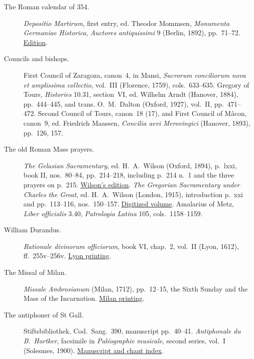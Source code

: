 \begin{description}
\item[The Roman calendar of 354.] \textit{Depositio Martirum},
  first entry, ed. Theodor Mommsen, \textit{Monumenta Germaniae
  Historica}, \textit{Auctores antiquissimi} 9 (Berlin, 1892),
  pp.~71--72.
  \href{https://www.dmgh.de/mgh_auct_ant_9/index.htm\#page/71/mode/1up}{Edition}.

\item[Councils and bishops.] First Council of Zaragoza, canon~4,
  in Mansi, \textit{Sacrorum conciliorum nova et amplissima collectio},
  vol.~III (Florence, 1759), cols.~633--635.
  Gregory of Tours, \textit{Histories} 10.31, section~VI,
  ed. Wilhelm Arndt (Hanover, 1884), pp.~444--445, and trans. O.~M.~Dalton (Oxford, 1927), vol.~II, pp.~471--472.
  Second Council of Tours, canon~18 (17), and First Council of Mâcon,
  canon~9, ed. Friedrich Maassen, \textit{Concilia aevi Merovingici}
  (Hanover, 1893), pp.~126, 157.

\item[The old Roman Mass prayers.] \textit{The Gelasian Sacramentary},
  ed. H.~A.~Wilson (Oxford, 1894), p.~lxxi, book II, nos.~80--84,
  pp.~214--218, including p.~214 n.~1 and
  the three prayers on p.~215.
  \href{https://archive.org/details/LiberSacramentorumRomanaeEcclesiae}{Wilson's edition}.
  \textit{The Gregorian
  Sacramentary under Charles the Great}, ed. H.~A.~Wilson
  (London, 1915), introduction p.~xxi and pp.~113--116, nos.~150--157.
  \href{https://commons.ptsem.edu/id/gregoriansacrame0049cath}{Digitized volume}.
  Amalarius of Metz, \textit{Liber officialis} 3.40,
  \textit{Patrologia Latina} 105, cols.~1158--1159.

\item[William Durandus.] \textit{Rationale divinorum officiorum},
  book VI, chap.~2, vol.~II (Lyon, 1612), ff.~255v--256v.
  \href{https://archive.org/details/rationalediuinor02dura}{Lyon printing}.

\item[The Missal of Milan.] \textit{Missale Ambrosianum} (Milan,
  1712), pp.~12--15, the Sixth Sunday and the Mass of the Incarnation.
  \href{https://archive.org/details/10869665bsb}{Milan printing}.

\item[The antiphoner of St Gall.] Stiftsbibliothek, Cod.~Sang.~390,
  manuscript pp.~40--41. \textit{Antiphonale du B.~Hartker}, facsimile
  in \textit{Paléographie musicale}, second series, vol.~I (Solesmes,
  1900). \href{https://cantusdatabase.org/chant/456197/}{Manuscript and chant index}.


\end{description}
